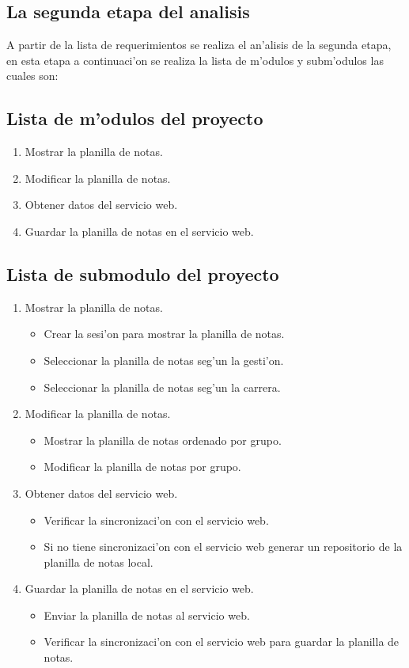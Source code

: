 \subsection{La segunda etapa del analisis}
\label{ModuloMovil}
A partir de la lista de requerimientos se realiza el an'alisis de la segunda etapa, en esta etapa a continuaci'on se realiza la lista de m'odulos y subm'odulos las cuales son: 

\subsection{Lista de m'odulos del proyecto}
\begin{enumerate}
\item Mostrar la planilla de notas.
\item Modificar la planilla de notas.
\item Obtener datos del servicio web.
\item Guardar la planilla de notas en el servicio web.
\end{enumerate}
     
\subsection{ Lista de submodulo del proyecto}
\begin{enumerate}
\item Mostrar la planilla de notas.
\begin{itemize}
\item Crear la sesi'on para mostrar la planilla de notas.
\item Seleccionar la planilla de notas seg'un la gesti'on.
\item Seleccionar la planilla de notas seg'un la carrera.
\end{itemize}

\item Modificar la planilla de notas.
\begin{itemize}
\item Mostrar la planilla de notas ordenado por grupo.
\item Modificar la planilla de notas por grupo.
\end{itemize}

\item Obtener datos del servicio web.
\begin{itemize}
\item Verificar la sincronizaci'on con el servicio web.
\item Si no tiene sincronizaci'on con el servicio web generar un repositorio de la planilla de notas local.
\end{itemize}

\item Guardar la planilla de notas en el servicio web.
\begin{itemize}
\item Enviar la planilla de notas al servicio web.
\item Verificar la sincronizaci'on con el servicio web para guardar la planilla de notas.
\end{itemize}
\end{enumerate}

